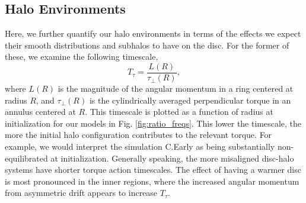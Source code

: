 \subsection{Halo Environments} \label{ssec:halo_env}





Here, we further quantify our halo environments in terms of the effects we expect their smooth distributions and subhalos to have on the disc. For the former of these, we examine the following timescale,
\begin{equation}
T_\tau = \frac{L(R)}{\tau_\perp(R)},
\end{equation}
where $L(R)$ is the magnitude of the angular momentum in a ring centered at radius $R$, and $\tau_\perp(R)$ is the cylindrically averaged perpendicular torque in an annulus centered at $R$. This timescale is plotted as a function of radius at initialization for our models in Fig. \ref{fig:ratio_freqs}. This lower the timescale, the more the initial halo configuration contributes to the relevant torque. For example, we would interpret the simulation C.Early as being substantially non-equilibrated at initialization. Generally speaking, the more misaligned disc-halo systems have shorter torque action timescales. The effect of having a warmer disc is most pronounced in the inner regions, where the increased angular momentum from asymmetric drift appears to increase $T_\tau$.


